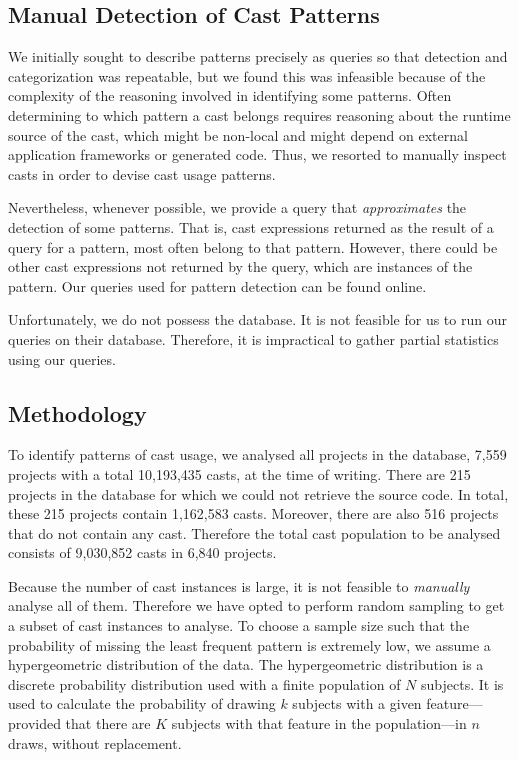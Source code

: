 \subsection*{Manual Detection of Cast Patterns}

We initially sought to describe patterns precisely as \ql{} queries so that
detection and categorization was repeatable,
but we found this was infeasible because of the
complexity of the reasoning involved in identifying some patterns.
Often determining to which pattern a cast belongs requires reasoning about the runtime source of the cast,
which might be non-local and might depend on external application frameworks or generated code.
Thus, we resorted to manually inspect casts in order to devise cast usage patterns.

Nevertheless, whenever possible,
we provide a \ql{} query that \emph{approximates} the detection of some patterns.
That is, cast expressions returned as the result of a \ql{} query for a pattern,
most often belong to that pattern.
However, there could be other cast expressions not returned by the query,
which are instances of the pattern.
Our \ql{} queries used for pattern detection can be found online.%

Unfortunately, we do not possess the \lgtm{} database.
It is not feasible for us to run our queries on their database.
Therefore, it is impractical to gather partial statistics using our queries.


\subsection*{Methodology}

To identify patterns of cast usage, we analysed all \java{} projects in the \lgtm{} database, 7,559 projects
with a total 10,193,435 casts, at the time of writing.
There are 215 projects in the database for which we could not retrieve the source code.
In total, these 215 projects contain 1,162,583 casts.
Moreover, there are also 516 projects that do not contain any cast.
Therefore the total cast population to be analysed consists of 9,030,852 casts in 6,840 projects.

Because the number of cast instances is large, it is not feasible to \emph{manually} analyse all of them.
Therefore we have opted to perform random sampling to get a subset of cast instances to analyse.
To choose a sample size such that
the probability of missing the least frequent pattern is extremely low, we assume a
hypergeometric distribution of the data.
The hypergeometric distribution is a discrete probability distribution used with a finite population of $N$ subjects.
It is used to calculate the probability of drawing $k$ subjects with a given feature---provided that there are $K$ subjects with that feature in the population---in $n$ draws, without replacement.

